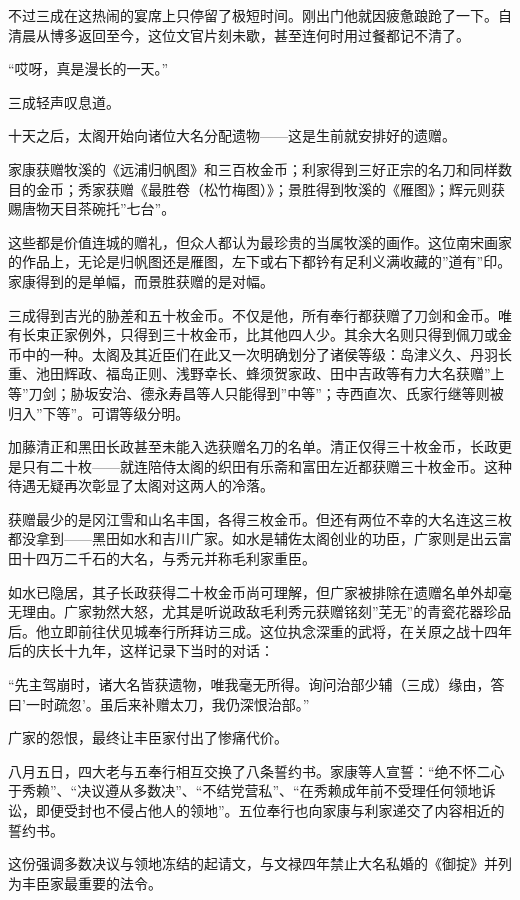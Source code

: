 \documentclass[
]{article}
\begin{document}
不过三成在这热闹的宴席上只停留了极短时间。刚出门他就因疲惫踉跄了一下。自清晨从博多返回至今，这位文官片刻未歇，甚至连何时用过餐都记不清了。

``哎呀，真是漫长的一天。''

三成轻声叹息道。

十天之后，太阁开始向诸位大名分配遗物------这是生前就安排好的遗赠。

家康获赠牧溪的《远浦归帆图》和三百枚金币；利家得到三好正宗的名刀和同样数目的金币；秀家获赠《最胜卷（松竹梅图）》；景胜得到牧溪的《雁图》；辉元则获赐唐物天目茶碗托''七台''。

这些都是价值连城的赠礼，但众人都认为最珍贵的当属牧溪的画作。这位南宋画家的作品上，无论是归帆图还是雁图，左下或右下都钤有足利义满收藏的''道有''印。家康得到的是单幅，而景胜获赠的是对幅。

三成得到吉光的胁差和五十枚金币。不仅是他，所有奉行都获赠了刀剑和金币。唯有长束正家例外，只得到三十枚金币，比其他四人少。其余大名则只得到佩刀或金币中的一种。太阁及其近臣们在此又一次明确划分了诸侯等级：岛津义久、丹羽长重、池田辉政、福岛正则、浅野幸长、蜂须贺家政、田中吉政等有力大名获赠''上等''刀剑；胁坂安治、德永寿昌等人只能得到''中等''；寺西直次、氏家行继等则被归入''下等''。可谓等级分明。

加藤清正和黑田长政甚至未能入选获赠名刀的名单。清正仅得三十枚金币，长政更是只有二十枚------就连陪侍太阁的织田有乐斋和富田左近都获赠三十枚金币。这种待遇无疑再次彰显了太阁对这两人的冷落。

获赠最少的是冈江雪和山名丰国，各得三枚金币。但还有两位不幸的大名连这三枚都没拿到------黑田如水和吉川广家。如水是辅佐太阁创业的功臣，广家则是出云富田十四万二千石的大名，与秀元并称毛利家重臣。

如水已隐居，其子长政获得二十枚金币尚可理解，但广家被排除在遗赠名单外却毫无理由。广家勃然大怒，尤其是听说政敌毛利秀元获赠铭刻''芜无''的青瓷花器珍品后。他立即前往伏见城奉行所拜访三成。这位执念深重的武将，在关原之战十四年后的庆长十九年，这样记录下当时的对话：

``先主驾崩时，诸大名皆获遗物，唯我毫无所得。询问治部少辅（三成）缘由，答曰'一时疏忽'。虽后来补赠太刀，我仍深恨治部。''

广家的怨恨，最终让丰臣家付出了惨痛代价。

八月五日，四大老与五奉行相互交换了八条誓约书。家康等人宣誓：``绝不怀二心于秀赖''、``决议遵从多数决''、``不结党营私''、``在秀赖成年前不受理任何领地诉讼，即便受封也不侵占他人的领地''。五位奉行也向家康与利家递交了内容相近的誓约书。

这份强调多数决议与领地冻结的起请文，与文禄四年禁止大名私婚的《御掟》并列为丰臣家最重要的法令。
\end{document}
